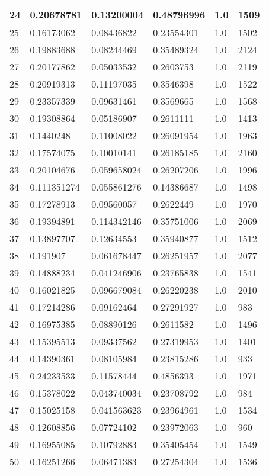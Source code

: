 \begin{longtable}{|l|l|l|l|l|l|}
24 & 0.20678781 & 0.13200004 & 0.48796996 & 1.0 & 1509 \\ \hline 
25 & 0.16173062 & 0.08436822 & 0.23554301 & 1.0 & 1502 \\ \hline 
26 & 0.19883688 & 0.08244469 & 0.35489324 & 1.0 & 2124 \\ \hline 
27 & 0.20177862 & 0.05033532 & 0.2603753 & 1.0 & 2119 \\ \hline 
28 & 0.20919313 & 0.11197035 & 0.3546398 & 1.0 & 1522 \\ \hline 
29 & 0.23357339 & 0.09631461 & 0.3569665 & 1.0 & 1568 \\ \hline 
30 & 0.19308864 & 0.05186907 & 0.2611111 & 1.0 & 1413 \\ \hline 
31 & 0.1440248 & 0.11008022 & 0.26091954 & 1.0 & 1963 \\ \hline 
32 & 0.17574075 & 0.10010141 & 0.26185185 & 1.0 & 2160 \\ \hline 
33 & 0.20104676 & 0.059658024 & 0.26207206 & 1.0 & 1996 \\ \hline 
34 & 0.111351274 & 0.055861276 & 0.14386687 & 1.0 & 1498 \\ \hline 
35 & 0.17278913 & 0.09560057 & 0.2622449 & 1.0 & 1970 \\ \hline 
36 & 0.19394891 & 0.114342146 & 0.35751006 & 1.0 & 2069 \\ \hline 
37 & 0.13897707 & 0.12634553 & 0.35940877 & 1.0 & 1512 \\ \hline 
38 & 0.191907 & 0.061678447 & 0.26251957 & 1.0 & 2077 \\ \hline 
39 & 0.14888234 & 0.041246906 & 0.23765838 & 1.0 & 1541 \\ \hline 
40 & 0.16021825 & 0.096679084 & 0.26220238 & 1.0 & 2010 \\ \hline 
41 & 0.17214286 & 0.09162464 & 0.27291927 & 1.0 & 983 \\ \hline 
42 & 0.16975385 & 0.08890126 & 0.2611582 & 1.0 & 1496 \\ \hline 
43 & 0.15395513 & 0.09337562 & 0.27319953 & 1.0 & 1401 \\ \hline 
44 & 0.14390361 & 0.08105984 & 0.23815286 & 1.0 & 933 \\ \hline 
45 & 0.24233533 & 0.11578444 & 0.4856393 & 1.0 & 1971 \\ \hline 
46 & 0.15378022 & 0.043740034 & 0.23708792 & 1.0 & 984 \\ \hline 
47 & 0.15025158 & 0.041563623 & 0.23964961 & 1.0 & 1534 \\ \hline 
48 & 0.12608856 & 0.07724102 & 0.23972063 & 1.0 & 960 \\ \hline 
49 & 0.16955085 & 0.10792883 & 0.35405454 & 1.0 & 1549 \\ \hline 
50 & 0.16251266 & 0.06471383 & 0.27254304 & 1.0 & 1536 \\ \hline 
\end{longtable}